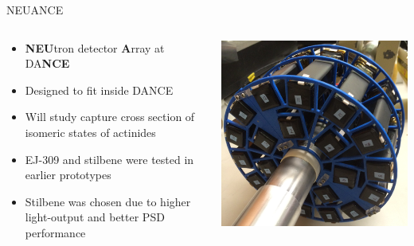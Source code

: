 \documentclass{beamer}
\begin{document}
\begin{frame}{NEUANCE}
\begin{columns}
  \begin{column}{0.65\textwidth}
    \begin{itemize}
    \item \textbf{NEU}tron detector \textbf{A}rray at DA\textbf{NCE}
    \item Designed to fit inside DANCE
    \item Will study capture cross section of isomeric states of actinides
    \item EJ-309 and stilbene were tested in earlier prototypes
    \item Stilbene was chosen due to higher light-output and better PSD performance
    \end{itemize}
  \end{column}
  \begin{column}{0.40\textwidth}
	\includegraphics[scale = 0.25]{NeuancePicture}
  \end{column}
\end{columns}
\end{frame}
\end{document}
